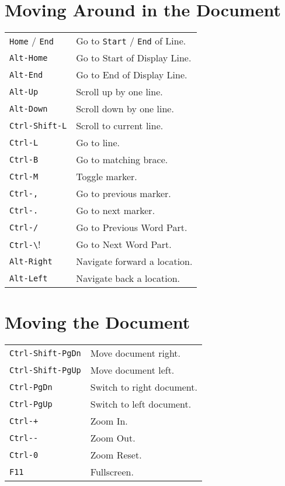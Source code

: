 \begin{multicols}{3}
\section{Moving Around in the Document}
\begin{tabular}{@{}ll@{}}
	\verb!Home! / \verb!End! & Go to  \verb!Start! / \verb!End! of Line. \\
	\verb!Alt-Home! & Go to Start of Display Line. \\
	\verb!Alt-End! & Go to End of Display Line. \\
	\verb!Alt-Up! & Scroll up by one line. \\
	\verb!Alt-Down! & Scroll down by one line. \\
	\verb!Ctrl-Shift-L! & Scroll to current line. \\
	\verb!Ctrl-L! & Go to line. \\
	\verb!Ctrl-B! & Go to matching brace. \\
	\verb!Ctrl-M! & Toggle marker. \\
	\verb!Ctrl-,! & Go to previous marker. \\
	\verb!Ctrl-.! & Go to next marker. \\
	\verb!Ctrl-/! & Go to Previous Word Part. \\
	\verb!Ctrl-\! & Go to Next Word Part. \\
	\verb!Alt-Right! & Navigate forward a location. \\
	\verb!Alt-Left! & Navigate back a location. \\
\end{tabular}

\section{Moving the Document}
\begin{tabular}{@{}ll@{}}
	\verb!Ctrl-Shift-PgDn! & Move document right. \\
	\verb!Ctrl-Shift-PgUp! & Move document left. \\
	\verb!Ctrl-PgDn! & Switch to right document. \\
	\verb!Ctrl-PgUp! & Switch to left document. \\
	\verb!Ctrl-+! & Zoom In. \\
	\verb!Ctrl--! & Zoom Out. \\
	\verb!Ctrl-0! & Zoom Reset. \\
	\verb!F11! & Fullscreen. \\
\end{tabular}


\end{multicols}
